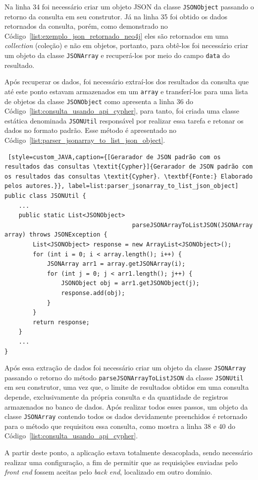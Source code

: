 Na linha 34 foi necessário criar um objeto JSON da classe \texttt{JSONObject} passando o retorno da consulta em seu construtor. Já na linha 35 foi obtido os dados retornados da consulta, porém, como demonstrado no Código~\ref{list:exemplo_json_retornado_neo4j} eles são retornados em uma \textit{collection} (coleção) e não em objetos, portanto, para obtê-los foi necessário criar um objeto da classe \texttt{JSONArray} e recuperá-los por meio do campo \texttt{data} do resultado.

Após recuperar os dados, foi necessário extraí-los dos resultados da consulta que até este ponto estavam armazenados em um \texttt{array} e transferí-los para uma lista de objetos da classe \texttt{JSONObject} como apresenta a linha 36 do Código~\ref{list:consulta_usando_api_cypher}, para tanto, foi criada uma classe estática denominada \texttt{JSONUtil} responsável por realizar essa tarefa e retonar os dados no formato padrão. Esse método é apresentado no Código~\ref{list:parser_jsonarray_to_list_json_object}.

\begin{lstlisting} [style=custom_JAVA,caption={[Gerarador de JSON padrão com os resultados das consultas \textit{Cypher}]{Gerarador de JSON padrão com os resultados das consultas \textit{Cypher}. \textbf{Fonte:} Elaborado pelos autores.}}, label=list:parser_jsonarray_to_list_json_object] 	
public class JSONUtil {
	...
	public static List<JSONObject>
									parseJSONArrayToListJSON(JSONArray array) throws JSONException {
		List<JSONObject> response = new ArrayList<JSONObject>();
		for (int i = 0; i < array.length(); i++) {
			JSONArray arr1 = array.getJSONArray(i);
			for (int j = 0; j < arr1.length(); j++) {
				JSONObject obj = arr1.getJSONObject(j);
				response.add(obj);
			}
		}
		return response;
	}
	...
}
\end{lstlisting}

Após essa extração de dados foi necessário criar um objeto da classe \texttt{JSONArray} passando o retorno do método \texttt{parseJSONArrayToListJSON} da classe \texttt{JSONUtil} em seu construtor, uma vez que, o limite de resultados obtidos em uma consulta depende, exclusivamente da própria consulta e da quantidade de registros armazenados no banco de dados. Após realizar todos esses passos, um objeto da classe \texttt{JSONArray} contendo todos os dados devidamente preenchidos é retornado para o método que requisitou essa consulta, como mostra a linha 38 e 40 do Código~\ref{list:consulta_usando_api_cypher}.
 
\par A partir deste ponto, a aplicação estava totalmente desacoplada, sendo necessário realizar uma configuração, a fim de permitir que as requisições enviadas pelo \textit{front end} fossem aceitas pelo \textit{back end}, localizado em outro domínio.

